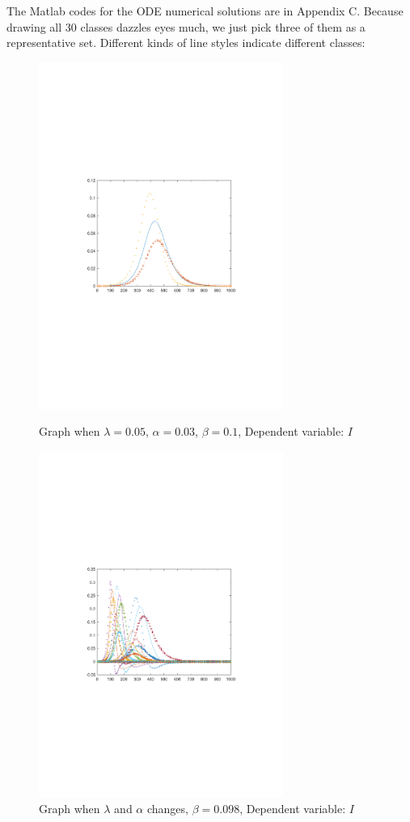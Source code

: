 \documentclass{mcmthesis}
\begin{document}
The Matlab codes for the ODE numerical solutions are in Appendix C. Because drawing all 30 classes dazzles eyes much, we just pick three of them as a representative set. Different kinds of line styles indicate different classes:
\newpage
\begin{figure}[htbp!]
  \begin{flushleft}
  	\begin{minipage}[t]{0.3\textwidth}
  \centering
  \includegraphics[width=8cm]{figures/f1}
  \caption{Graph when $\lambda=0.05$, $\alpha=0.03$, $\beta=0.1$, Dependent variable: $I$}
  \end{minipage}
  \qquad\qquad\qquad\qquad
  	\begin{minipage}[t]{0.3\textwidth}
  \centering
  \includegraphics[width=8cm]{figures/f2}
  \caption{Graph when $\lambda$ and $\alpha$ changes, $\beta=0.098$, Dependent variable: $I$}
  \end{minipage}
  \end{flushleft}
  
\end{figure}
\end{document}
